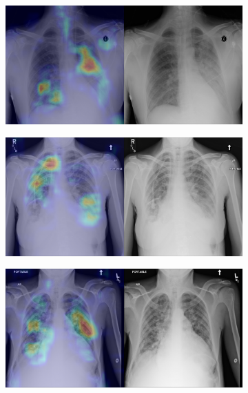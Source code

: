 \begin{figure}[b]
\begin{subfigure}{0.4\textwidth}
    \end{subfigure}
    \begin{subfigure}{0.4\textwidth}
        \centering
        \includegraphics[width=1.0\textwidth]{Chapters/5. Conclusiones/img/Edema/1_1_00003528_021.png}
    \end{subfigure}
    \begin{subfigure}{0.4\textwidth}
        \centering
        \includegraphics[width=1.0\textwidth]{Chapters/5. Conclusiones/img/Edema/1_1_00003803_009.png}
    \end{subfigure}
    \begin{subfigure}{0.4\textwidth}
        \centering
        \includegraphics[width=1.0\textwidth]{Chapters/5. Conclusiones/img/Edema/1_1_00004533_020.png}

\end{subfigure}
\end{figure}

